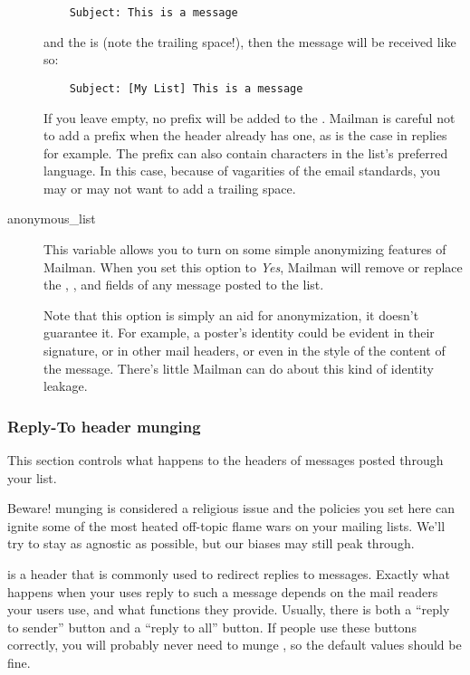 \documentclass{howto}
\begin{document}
\begin{description}
    \begin{verbatim}
    Subject: This is a message
    \end{verbatim}

    and the  is \code{[My List] } (note the
    trailing space!), then the message will be received like so:

    \begin{verbatim}
    Subject: [My List] This is a message
    \end{verbatim}

    If you leave  empty, no prefix will be added
    to the .  Mailman is careful not to add a
    prefix when the header already has one, as is the case in replies
    for example.  The prefix can also contain characters in the list's
    preferred language.  In this case, because of vagarities of the
    email standards, you may or may not want to add a trailing space.

\item[anonymous_list]
    This variable allows you to turn on some simple anonymizing
    features of Mailman.  When you set this option to \emph{Yes},
    Mailman will remove or replace the ,
    , and  fields of any
    message posted to the list.

    Note that this option is simply an aid for anonymization, it
    doesn't guarantee it.  For example, a poster's identity could be
    evident in their signature, or in other mail headers, or even in
    the style of the content of the message.  There's little Mailman
    can do about this kind of identity leakage.
\end{description}

\subsubsection{Reply-To header munging}

This section controls what happens to the 
headers of messages posted through your list.

Beware!   munging is considered a religious issue
and the policies you set here can ignite some of the most heated
off-topic flame wars on your mailing lists.  We'll try to stay as
agnostic as possible, but our biases may still peak through.

 is a header that is commonly used to redirect
replies to messages.  Exactly what happens when your uses reply to
such a message depends on the mail readers your users use, and what
functions they provide.  Usually, there is both a ``reply to sender''
button and a ``reply to all'' button.  If people use these buttons
correctly, you will probably never need to munge
, so the default values should be fine.
\end{document}
